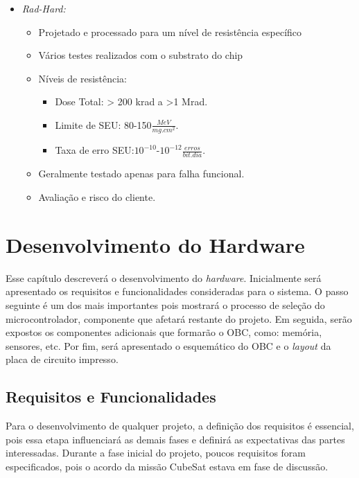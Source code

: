 \begin{itemize}
\begin{itemize}
	\end{itemize}
	
	\item \textit{Rad-Hard:}
	\begin{itemize}
		\item Projetado e processado para um nível de resistência específico
		\item Vários testes realizados com o substrato do chip
		\item Níveis de resistência: 
		\begin{itemize}
			\item Dose Total: > 200 krad a >1 Mrad.
			\item Limite de SEU: 80-150$\frac{MeV}{mg.cm^{2}}$.
			\item Taxa de erro SEU:${10^{-10}}$-$10^{-12}\frac{erros}{bit.dia}$.
		\end{itemize}  
		
		\item Geralmente testado apenas para falha funcional.
		\item Avaliação e risco do cliente.
		
	\end{itemize}
\end{itemize}


\chapter[Desenvolvimento do Hardware]{Desenvolvimento do Hardware}
\label{secaoHardware}
Esse capítulo descreverá o desenvolvimento do \textit{hardware}. Inicialmente será apresentado os requisitos e funcionalidades consideradas para o sistema. O passo seguinte é um dos mais importantes pois mostrará o processo de seleção do microcontrolador, componente que afetará restante do projeto. Em seguida, serão expostos os componentes adicionais que formarão o OBC, como: memória, sensores, etc. Por fim, será apresentado o esquemático do OBC e o \textit{layout} da placa de circuito impresso. 

\section{Requisitos e Funcionalidades}
\label{seção1_1}
Para o desenvolvimento de qualquer projeto, a definição dos requisitos é essencial, pois essa etapa influenciará as demais fases e definirá as expectativas das partes interessadas. Durante a fase inicial do projeto, poucos requisitos foram especificados, pois o acordo da missão CubeSat estava em fase de discussão. 

